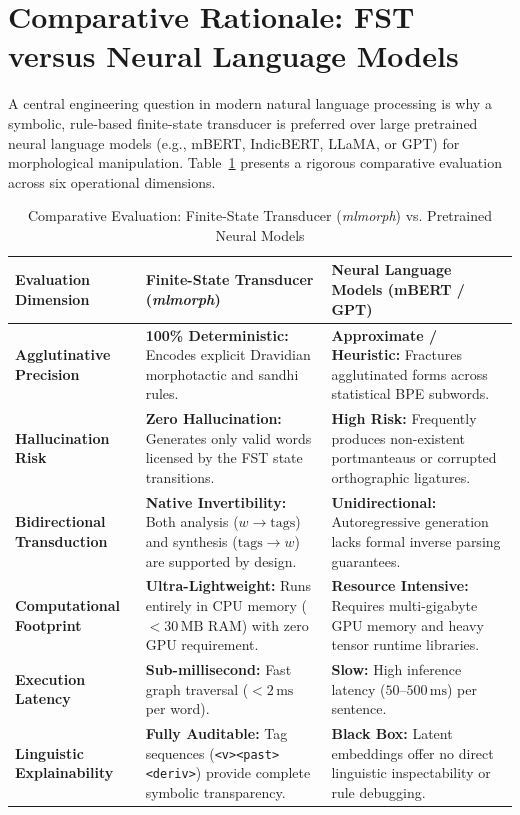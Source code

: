 
\section{Comparative Rationale: FST versus Neural Language Models}
\label{sec:fst_vs_neural}

A central engineering question in modern natural language processing is why a symbolic, rule-based finite-state transducer is preferred over large pretrained neural language models (e.g., mBERT, IndicBERT, LLaMA, or GPT) for morphological manipulation. Table~\ref{tab:fst_vs_neural_comparison} presents a rigorous comparative evaluation across six operational dimensions.

\begin{table}[H]
\centering
\small
\caption{Comparative Evaluation: Finite-State Transducer (\textit{mlmorph}) vs. Pretrained Neural Models}
\label{tab:fst_vs_neural_comparison}
\begin{tabular}{>{\raggedright\arraybackslash}p{3.2cm} >{\raggedright\arraybackslash}p{5.8cm} >{\raggedright\arraybackslash}p{5.8cm}}
\toprule
\textbf{Evaluation Dimension} & \textbf{Finite-State Transducer (\textit{mlmorph})} & \textbf{Neural Language Models (mBERT / GPT)} \\
\midrule
\textbf{Agglutinative Precision} & \textbf{100\% Deterministic:} Encodes explicit Dravidian morphotactic and sandhi rules. & \textbf{Approximate / Heuristic:} Fractures agglutinated forms across statistical BPE subwords. \\
\midrule
\textbf{Hallucination Risk} & \textbf{Zero Hallucination:} Generates only valid words licensed by the FST state transitions. & \textbf{High Risk:} Frequently produces non-existent portmanteaus or corrupted orthographic ligatures. \\
\midrule
\textbf{Bidirectional Transduction} & \textbf{Native Invertibility:} Both analysis ($w \to \text{tags}$) and synthesis ($\text{tags} \to w$) are supported by design. & \textbf{Unidirectional:} Autoregressive generation lacks formal inverse parsing guarantees. \\
\midrule
\textbf{Computational Footprint} & \textbf{Ultra-Lightweight:} Runs entirely in CPU memory ($<30\,\text{MB}$ RAM) with zero GPU requirement. & \textbf{Resource Intensive:} Requires multi-gigabyte GPU memory and heavy tensor runtime libraries. \\
\midrule
\textbf{Execution Latency} & \textbf{Sub-millisecond:} Fast graph traversal ($<2\,\text{ms}$ per word). & \textbf{Slow:} High inference latency ($50\text{--}500\,\text{ms}$) per sentence. \\
\midrule
\textbf{Linguistic Explainability} & \textbf{Fully Auditable:} Tag sequences (\texttt{<v><past><deriv>}) provide complete symbolic transparency. & \textbf{Black Box:} Latent embeddings offer no direct linguistic inspectability or rule debugging. \\
\bottomrule
\end{tabular}
\end{table}

